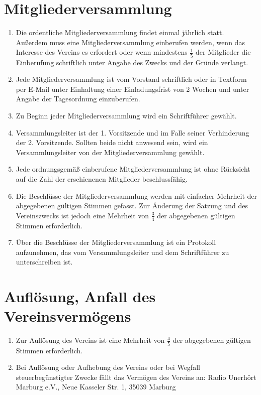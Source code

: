\documentclass[10pt,conference,a4paper,nofonttune]{IEEEtran}
\begin{document}
\section{Mitgliederversammlung}
\begin{enumerate}
  \item Die ordentliche Mitgliederversammlung findet einmal jährlich statt.
    Außerdem muss eine Mitgliederversammlung einberufen werden, wenn das
    Interesse des Vereins es erfordert oder wenn mindestens $\frac{1}{5}$ der
    Mitglieder die Einberufung schriftlich unter Angabe des Zwecks und der
    Gründe verlangt.

  \item Jede Mitgliederversammlung ist vom Vorstand schriftlich oder in Textform
    per E-Mail unter Einhaltung einer Einladungsfrist von 2 Wochen und unter
    Angabe der Tagesordnung einzuberufen.

  \item Zu Beginn jeder Mitgliederversammlung wird ein Schriftführer gewählt.

  \item Versammlungsleiter ist der 1. Vorsitzende und im Falle seiner
    Verhinderung der 2. Vorsitzende. Sollten beide nicht anwesend sein, wird ein
    Versammlungsleiter von der Mitgliederversammlung gewählt.

  \item Jede ordnungsgemäß einberufene Mitgliederversammlung ist ohne Rücksicht
    auf die Zahl der erschienenen Mitglieder beschlussfähig.

  \item Die Beschlüsse der Mitgliederversammlung werden mit einfacher Mehrheit
    der abgegebenen gültigen Stimmen gefasst. Zur Änderung der Satzung und des
    Vereinszwecks ist jedoch eine Mehrheit von $\frac{3}{4}$ der abgegebenen
    gültigen Stimmen erforderlich.

  \item Über die Beschlüsse der Mitgliederversammlung ist ein Protokoll
    aufzunehmen, das vom Versammlungsleiter und dem Schriftführer zu
    unterschreiben ist.
\end{enumerate}


\section{Auflösung, Anfall des Vereinsvermögens}
\begin{enumerate}
  \item Zur Auflösung des Vereins ist eine Mehrheit von $\frac{4}{5}$ der
    abgegebenen gültigen Stimmen erforderlich.

  \item Bei Auflösung oder Aufhebung des Vereins oder bei Wegfall
    steuerbegünstigter Zwecke fällt das Vermögen des Vereins an:
    Radio Unerhört Marburg e.V., Neue Kasseler Str. 1, 35039 Marburg
\end{enumerate}
\end{document}
